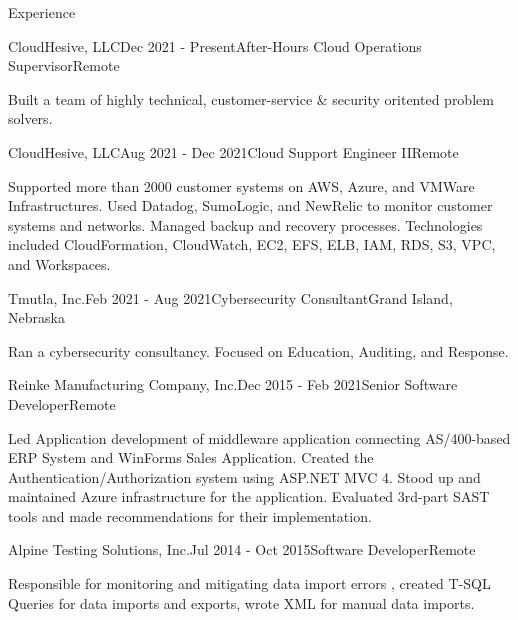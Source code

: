 \documentclass{resume} %
\begin{document}

\begin{rSection}{Experience}

\begin{rSubsection}{CloudHesive, LLC}{Dec 2021 - Present}{After-Hours Cloud Operations Supervisor}{Remote}
\item Built a team of highly technical, customer-service \& security oritented problem solvers.  
\end{rSubsection}

\begin{rSubsection}{CloudHesive, LLC}{Aug 2021 - Dec 2021}{Cloud Support Engineer II}{Remote}
\item Supported more than 2000 customer systems on AWS, Azure, and VMWare Infrastructures. Used Datadog, SumoLogic, and NewRelic to monitor customer systems and networks. Managed backup and recovery processes. Technologies included CloudFormation, CloudWatch, EC2, EFS, ELB, IAM, RDS, S3, VPC, and Workspaces.  
\end{rSubsection}

\begin{rSubsection}{Tmutla, Inc.}{Feb 2021 - Aug 2021}{Cybersecurity Consultant}{Grand Island, Nebraska}
\item Ran a cybersecurity consultancy. Focused on Education, Auditing, and Response.
\end{rSubsection}

\begin{rSubsection}{Reinke Manufacturing Company, Inc.}{Dec 2015 - Feb 2021}{Senior Software Developer}{Remote} 
\item Led Application development of middleware application connecting AS/400-based ERP System and WinForms Sales Application. Created the Authentication/Authorization system using ASP.NET MVC 4. Stood up and maintained Azure infrastructure for the application. Evaluated 3rd-part SAST tools and made recommendations for their implementation.
\end{rSubsection}

\begin{rSubsection}{Alpine Testing Solutions, Inc.}{Jul 2014 - Oct 2015}{Software Developer}{Remote}
\item Responsible for monitoring and mitigating data import errors , created T-SQL Queries for data imports and exports, wrote XML for manual data imports.
\end{rSubsection}

\end{rSection}
\end{document}
